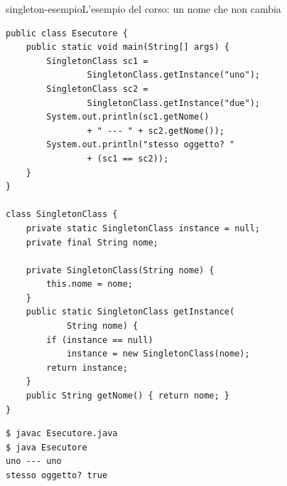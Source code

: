 \begin{programma}{singleton-esempio}{L'esempio del corso: un nome che non cambia}
\begin{lstlisting}[style=javacs, name=Esecutore.java]
public class Esecutore {
    public static void main(String[] args) {
        SingletonClass sc1 =
                SingletonClass.getInstance("uno");
        SingletonClass sc2 =
                SingletonClass.getInstance("due");
        System.out.println(sc1.getNome()
                + " --- " + sc2.getNome());
        System.out.println("stesso oggetto? "
                + (sc1 == sc2));
    }
}

class SingletonClass {
    private static SingletonClass instance = null;
    private final String nome;

    private SingletonClass(String nome) {
        this.nome = nome;
    }
    public static SingletonClass getInstance(
            String nome) {
        if (instance == null)
            instance = new SingletonClass(nome);
        return instance;
    }
    public String getNome() { return nome; }
}
\end{lstlisting}
\tcblower
{}

\medskip
\begin{lstlisting}[style=shellcs, name=Terminale]
$ javac Esecutore.java
$ java Esecutore
uno --- uno
stesso oggetto? true
\end{lstlisting}
\end{programma}

